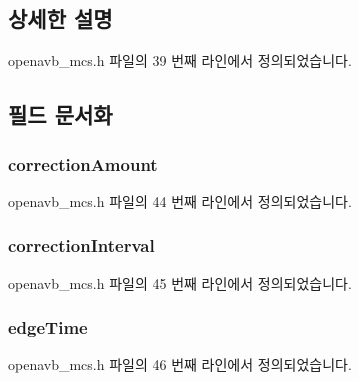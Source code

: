 \subsection{상세한 설명}


openavb\+\_\+mcs.\+h 파일의 39 번째 라인에서 정의되었습니다.



\subsection{필드 문서화}
\subsubsection[{\texorpdfstring{correction\+Amount}{correctionAmount}}]{ correction\+Amount}\hypertarget{structmcs__t_a409bc76adf1e5c9d63d0ad888b3def8f}{}\label{structmcs__t_a409bc76adf1e5c9d63d0ad888b3def8f}


openavb\+\_\+mcs.\+h 파일의 44 번째 라인에서 정의되었습니다.

\subsubsection[{\texorpdfstring{correction\+Interval}{correctionInterval}}]{ correction\+Interval}\hypertarget{structmcs__t_a477f1f85f2290ef7914f73b6a8d93632}{}\label{structmcs__t_a477f1f85f2290ef7914f73b6a8d93632}


openavb\+\_\+mcs.\+h 파일의 45 번째 라인에서 정의되었습니다.

\subsubsection[{\texorpdfstring{edge\+Time}{edgeTime}}]{ edge\+Time}\hypertarget{structmcs__t_a99b06b68590b7637eacd45776c7fc77b}{}\label{structmcs__t_a99b06b68590b7637eacd45776c7fc77b}


openavb\+\_\+mcs.\+h 파일의 46 번째 라인에서 정의되었습니다.

